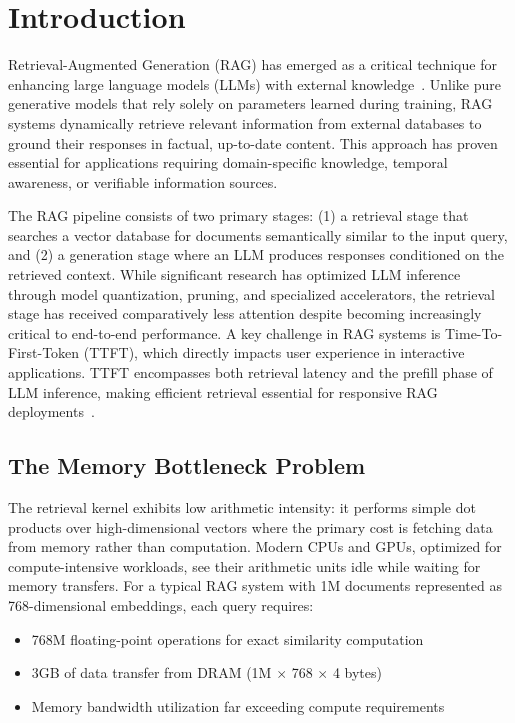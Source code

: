 \documentclass[conference]{IEEEtran}
\begin{document}
\section{Introduction}

Retrieval-Augmented Generation (RAG) has emerged as a critical technique for enhancing large language models (LLMs) with external knowledge~\cite{lewis2020retrieval}. Unlike pure generative models that rely solely on parameters learned during training, RAG systems dynamically retrieve relevant information from external databases to ground their responses in factual, up-to-date content. This approach has proven essential for applications requiring domain-specific knowledge, temporal awareness, or verifiable information sources.

The RAG pipeline consists of two primary stages: (1) a retrieval stage that searches a vector database for documents semantically similar to the input query, and (2) a generation stage where an LLM produces responses conditioned on the retrieved context. While significant research has optimized LLM inference through model quantization, pruning, and specialized accelerators, the retrieval stage has received comparatively less attention despite becoming increasingly critical to end-to-end performance. A key challenge in RAG systems is Time-To-First-Token (TTFT), which directly impacts user experience in interactive applications. TTFT encompasses both retrieval latency and the prefill phase of LLM inference, making efficient retrieval essential for responsive RAG deployments~\cite{refrag2025}.

\subsection{The Memory Bottleneck Problem}

The retrieval kernel exhibits low arithmetic intensity: it performs simple dot products over high-dimensional vectors where the primary cost is fetching data from memory rather than computation. Modern CPUs and GPUs, optimized for compute-intensive workloads, see their arithmetic units idle while waiting for memory transfers. For a typical RAG system with 1M documents represented as 768-dimensional embeddings, each query requires:
\begin{itemize}
    \item 768M floating-point operations for exact similarity computation
    \item 3GB of data transfer from DRAM (1M $\times$ 768 $\times$ 4 bytes)
    \item Memory bandwidth utilization far exceeding compute requirements
\end{itemize}
\end{document}
